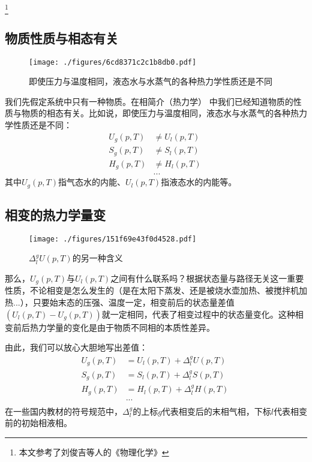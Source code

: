 
\footnote{本文参考了刘俊吉等人的《物理化学》}

\subsection{物质性质与相态有关}
\begin{figure}[ht]
\centering
\texttt{[image: ./figures/6cd8371c2c1b8db0.pdf]}
\caption{即使压力与温度相同，液态水与水蒸气的各种热力学性质还是不同} \label{fig_PTTVC2_1}
\end{figure}

我们先假定系统中只有一种物质。在相简介（热力学） 中我们已经知道物质的性质与物质的相态有关。比如说，即使压力与温度相同，液态水与水蒸气的各种热力学性质还是不同：
$$
\begin{aligned}
U_g(p,T) &\ne U_l(p,T)\\
S_g(p,T) &\ne S_l(p,T)\\
H_g(p,T) &\ne H_l(p,T)\\
&...
\end{aligned}~
$$
其中$U_g(p,T)$指气态水的内能、$U_l(p,T)$指液态水的内能等。

\subsection{相变的热力学量变}
\begin{figure}[ht]
\centering
\texttt{[image: ./figures/151f69e43f0d4528.pdf]}
\caption{$\Delta ^ g_l U (p,T)$的另一种含义} \label{fig_PTTVC2_2}
\end{figure}

那么，$U_g(p,T)$与$U_l(p,T)$之间有什么联系吗？根据状态量与路径无关这一重要性质，不论相变是怎么发生的（是在太阳下蒸发、还是被烧水壶加热、被搅拌机加热...），只要始末态的压强、温度一定，相变前后的状态量差值$(U_l(p,T) - U_g(p,T))$就一定相同，代表了相变过程中的状态量变化。这种相变前后热力学量的变化是由于物质不同相的本质性差异。

由此，我们可以放心大胆地写出差值：
$$
\begin{aligned}
U_g(p,T) &= U_l(p,T) + \Delta ^ g_l U (p,T)\\
S_g(p,T) &= S_l(p,T) + \Delta ^ g_l S (p,T)\\
H_g(p,T) &= H_l(p,T) + \Delta ^ g_l H (p,T)\\
&...\\
\end{aligned}~
$$
在一些国内教材的符号规范中，$\Delta^g_l$的上标$g$代表相变后的末相气相，下标$l$代表相变前的初始相液相。

